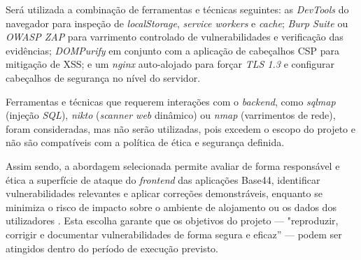 Será utilizada a combinação de ferramentas e técnicas seguintes:
as \textit{DevTools} do navegador para inspeção de \textit{localStorage},
\textit{service workers} \cite{ref8} e \textit{cache};
\textit{Burp Suite} ou \textit{OWASP ZAP} \cite{ref23} para varrimento controlado
de vulnerabilidades e verificação das evidências;
\textit{DOMPurify} em conjunto com a aplicação de cabeçalhos CSP \cite{ref25}
para mitigação de XSS;
e um \textit{nginx} auto-alojado para forçar \textit{TLS 1.3}
e configurar cabeçalhos de segurança \cite{ref19} no nível do servidor.

Ferramentas e técnicas que requerem interações com o \textit{backend},
como \textit{sqlmap} (injeção \textit{SQL}), \textit{nikto} (\textit{scanner web} dinâmico)
ou \textit{nmap} (varrimentos de rede), foram consideradas, mas não serão utilizadas,
pois excedem o escopo do projeto e não são compatíveis com a política de ética e segurança definida.

Assim sendo, a abordagem selecionada permite avaliar de forma responsável e ética
a superfície de ataque do \textit{frontend} das aplicações Base44,
identificar vulnerabilidades relevantes e aplicar correções demonstráveis,
enquanto se minimiza o risco de impacto sobre o ambiente de alojamento
ou os dados dos utilizadores \cite{ref27}.
Esta escolha garante que os objetivos do projeto — "reproduzir, corrigir e documentar
vulnerabilidades de forma segura e eficaz” — podem ser atingidos
dentro do período de execução previsto.

\newpage